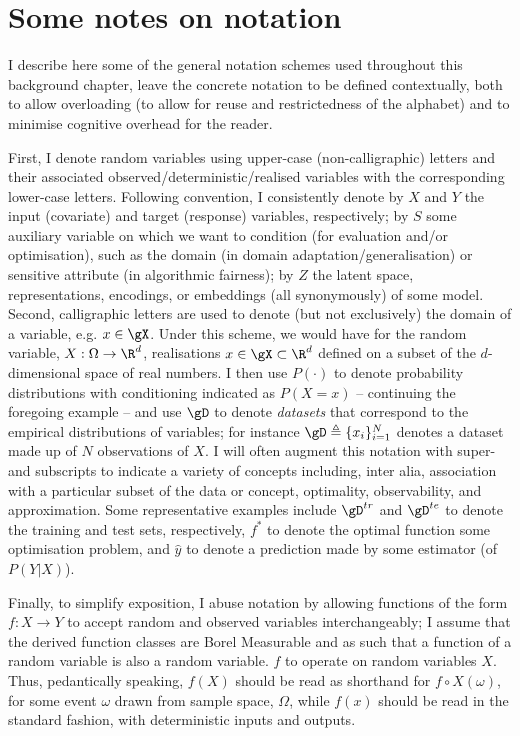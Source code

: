 \section{Some notes on notation}\label{sec:notation}
I describe here some of the general notation schemes used throughout this background chapter,
leave the concrete notation to be defined contextually, both to allow overloading (to allow for
reuse and restrictedness of the alphabet) and to minimise cognitive overhead for the reader.

%
First, I denote random variables using upper-case (non-calligraphic) letters and their associated
observed/deterministic/realised variables with the corresponding lower-case letters.
%
Following convention, I consistently denote by \(X\) and \(Y\) the input (covariate) and
target (response) variables, respectively; by \(S\) some auxiliary variable on which we want to
condition (for evaluation and/or optimisation), such as the domain (in domain
adaptation/generalisation) or sensitive attribute (in algorithmic fairness); by \(Z\) the latent
space, representations, encodings, or embeddings (all synonymously) of some model.
%
Second, calligraphic letters are used to denote (but not exclusively) the domain of a variable,
e.g. \(x \in \gX \).
%
Under this scheme, we would have for the random variable, \(X: \Omega \to \R^d \), realisations \(x
\in \gX \subset \R^d \) defined on a subset of the \(d\)-dimensional space of real numbers.
%
I then use \(P(\cdot)\) to denote probability distributions with conditioning indicated as
\(P(X=x)\) -- continuing the foregoing example -- and use \(\gD\) to denote \emph{datasets} that
correspond to the empirical distributions of variables; for instance \(\gD \triangleq
\{x_i\}_{i=1}^N \) denotes a dataset made up of \(N\) observations of \(X\).
%
I will often augment this notation with super- and subscripts to indicate a variety of concepts
including, inter alia, association with a particular subset of the data or concept, optimality,
observability, and approximation.
%
Some representative examples include \(\gD^{tr}\) and \(\gD^{te}\) to denote the training and test
sets, respectively, \(f^\ast\) to denote the optimal function \wrt{} some optimisation problem, and
\(\hat{y}\) to denote a prediction made by some estimator (of \(P(Y|X)\)).
%

%
Finally, to simplify exposition, I abuse notation by allowing functions of the form \(f: X \to Y
\) to accept random and observed variables interchangeably; I assume that the derived function
classes are Borel Measurable and as such that a function of a random variable is also a random
variable. \(f\) to operate on random variables \(X\).
Thus, pedantically speaking, \( f(X) \) should be read as shorthand for \( f \circ X(\omega) \),
for some event \( \omega \) drawn from sample space, \( \Omega \), while \( f(x) \) should be read
in the standard fashion, with deterministic inputs and outputs.
